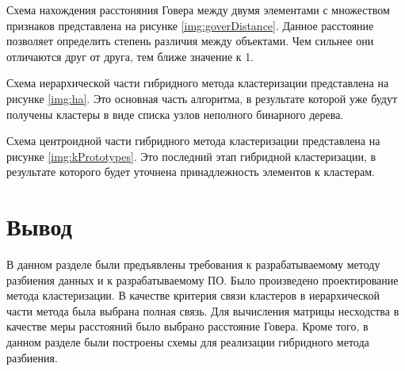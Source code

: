 \clearpage
Схема нахождения расстоняния Говера между двумя элементами с множеством признаков представлена на рисунке \ref{img:goverDistance}. Данное расстояние позволяет определить степень различия между объектами. Чем сильнее они отличаются друг от друга, тем ближе значение к 1.

\clearpage
Схема иерархической части гибридного метода кластеризации представлена на рисунке \ref{img:ha}. Это основная часть алгоритма, в результате которой уже будут получены кластеры в виде списка узлов неполного бинарного дерева.

\clearpage
Схема центроидной части гибридного метода кластеризации представлена на рисунке \ref{img:kPrototypes}. Это последний этап гибридной кластеризации, в результате которого будет уточнена принадлежность элементов к кластерам.

\clearpage
\section*{Вывод}

В данном разделе были предъявлены требования к разрабатываемому методу разбиения данных и к разрабатываемому ПО. Было произведено проектирование метода кластеризации. В качестве критерия связи кластеров в иерархической части метода была выбрана полная связь. Для вычисления матрицы несходства в качестве меры расстояний было выбрано расстояние Говера. Кроме того, в данном разделе были построены схемы для реализации гибридного метода разбиения.
